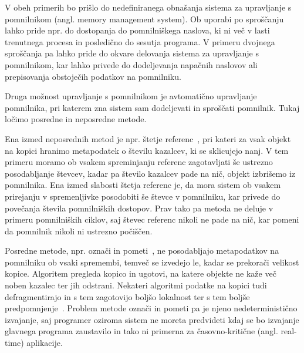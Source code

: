 V obeh primerih bo prišlo do nedefiniranega obnašanja sistema za upravljanje s pomnilnikom (angl. memory management system). Ob uporabi po sproščanju lahko pride npr. do dostopanja do pomnilniškega naslova, ki ni več v lasti trenutnega procesa in posledično do sesutja programa. V primeru dvojnega sproščanja pa lahko pride do okvare delovanja sistema za upravljanje s pomnilnikom, kar lahko privede do dodeljevanja napačnih naslovov ali prepisovanja obstoječih podatkov na pomnilniku.

Druga možnost upravljanje s pomnilnikom je avtomatično upravljanje pomnilnika, pri katerem zna sistem sam dodeljevati in sproščati pomnilnik. Tukaj ločimo posredne in neposredne metode.

Ena izmed neposrednih metod je npr. štetje referenc~\cite{collins1960method}, pri kateri za vsak objekt na kopici hranimo metapodatek o številu kazalcev, ki se sklicujejo nanj. V tem primeru moramo ob vsakem spreminjanju referenc zagotavljati še ustrezno posodabljanje števcev, kadar pa število kazalcev pade na nič, objekt izbrišemo iz pomnilnika. Ena izmed slabosti štetja referenc je, da mora sistem ob vsakem prirejanju v spremenljivke posodobiti še števce v pomnilniku, kar privede do povečanja števila pomnilniških dostopov. Prav tako pa metoda ne deluje v primeru pomnilniških ciklov, saj števec referenc nikoli ne pade na nič, kar pomeni da pomnilnik nikoli ni ustrezno počiščen.

Posredne metode, npr. označi in pometi~\cite{mccarthy1960recursive}, ne posodabljajo metapodatkov na pomnilniku ob vsaki spremembi, temveč se izvedejo le, kadar se prekorači velikost kopice. Algoritem pregleda kopico in ugotovi, na katere objekte ne kaže več noben kazalec ter jih odstrani. Nekateri algoritmi podatke na kopici tudi defragmentirajo in s tem zagotovijo boljšo lokalnost ter s tem boljše predpomnjenje~\cite{fenichel1969lisp}. Problem metode označi in pometi pa je njeno nedeterministično izvajanje, saj programer oziroma sistem ne moreta predvideti kdaj se bo izvajanje glavnega programa zaustavilo in tako ni primerna za časovno-kritične (angl. real-time) aplikacije.

